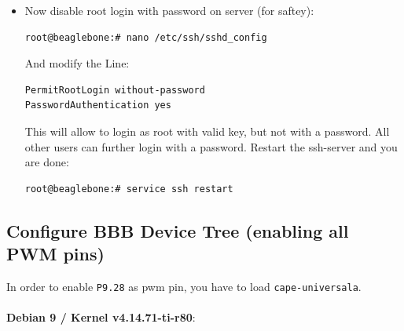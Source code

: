 \documentclass[
	fontsize=10pt
	paper=a4
]{scrartcl}
\begin{document}
\begin{itemize}
\item Now disable root login with password on server (for saftey):
\begin{lstlisting}
root@beaglebone:# nano /etc/ssh/sshd_config
\end{lstlisting}
And modify the Line:
\begin{lstlisting}
PermitRootLogin without-password
PasswordAuthentication yes
\end{lstlisting}
This will allow to login as root with valid key, but not with a password.
All other users can further login with a password.
Restart the ssh-server and you are done: 
\begin{lstlisting}
root@beaglebone:# service ssh restart
\end{lstlisting}
\end{itemize}



\subsection{Configure BBB Device Tree (enabling all PWM pins)}

In order to enable \texttt{P9.28} as pwm pin, you have to load \texttt{cape-universala}.\\
\\
\textbf{Debian 9 / Kernel v4.14.71-ti-r80}:
\end{document}
